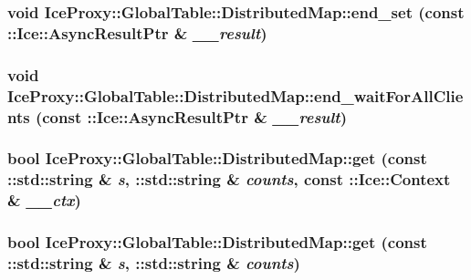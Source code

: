 \label{class_ice_proxy_1_1_global_table_1_1_distributed_map_a8875ce0c21f88fd62c59d40e5991f248}
\hypertarget{class_ice_proxy_1_1_global_table_1_1_distributed_map_ae239c32c97bd02ee75aeef48aa70ae2c}{
\subsubsection[{end\_\-set}]{\setlength{\rightskip}{0pt plus 5cm}void IceProxy::GlobalTable::DistributedMap::end\_\-set (const ::Ice::AsyncResultPtr \& {\em \_\-\_\-result})}}
\label{class_ice_proxy_1_1_global_table_1_1_distributed_map_ae239c32c97bd02ee75aeef48aa70ae2c}
\hypertarget{class_ice_proxy_1_1_global_table_1_1_distributed_map_a2f84e89cda3515a953de82f6fb5ea584}{
\subsubsection[{end\_\-waitForAllClients}]{\setlength{\rightskip}{0pt plus 5cm}void IceProxy::GlobalTable::DistributedMap::end\_\-waitForAllClients (const ::Ice::AsyncResultPtr \& {\em \_\-\_\-result})}}
\label{class_ice_proxy_1_1_global_table_1_1_distributed_map_a2f84e89cda3515a953de82f6fb5ea584}
\hypertarget{class_ice_proxy_1_1_global_table_1_1_distributed_map_a93c12f567b9d4728088f599772a0b2d7}{
\subsubsection[{get}]{\setlength{\rightskip}{0pt plus 5cm}bool IceProxy::GlobalTable::DistributedMap::get (const ::std::string \& {\em s}, \/  ::std::string \& {\em counts}, \/  const ::Ice::Context \& {\em \_\-\_\-ctx})}}
\label{class_ice_proxy_1_1_global_table_1_1_distributed_map_a93c12f567b9d4728088f599772a0b2d7}
\hypertarget{class_ice_proxy_1_1_global_table_1_1_distributed_map_aef433a6d435244568923a72eb70282f5}{
\subsubsection[{get}]{\setlength{\rightskip}{0pt plus 5cm}bool IceProxy::GlobalTable::DistributedMap::get (const ::std::string \& {\em s}, \/  ::std::string \& {\em counts})}}
